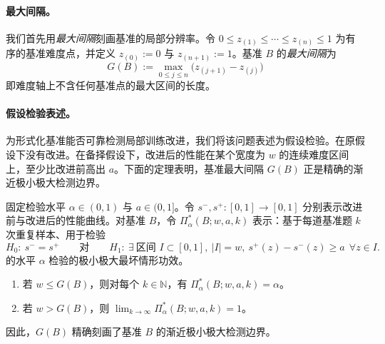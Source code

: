 

\paragraph{最大间隔。}
我们首先用\emph{最大间隔}刻画基准的局部分辨率。令 $0 \le z_{(1)} \le \cdots \le z_{(n)} \le 1$ 为有序的基准难度点，并定义 $z_{(0)}:=0$ 与 $z_{(n+1)}:=1$。基准 $B$ 的\emph{最大间隔}为
\begin{equation}
G(B):=\max_{0\le j\le n}\bigl(z_{(j+1)}-z_{(j)}\bigr)
\label{eq:max_gap}
\end{equation}
即难度轴上不含任何基准点的最大区间的长度。

\paragraph{假设检验表述。}
为形式化基准能否可靠检测局部训练改进，我们将该问题表述为假设检验。在原假设下没有改进。在备择假设下，改进后的性能在某个宽度为 $w$ 的连续难度区间上，至少比改进前高出 $a$。下面的定理表明，基准最大间隔 $G(B)$ 正是精确的渐近极小极大检测边界。

\begin{theorem}[最大间隔作为精确的渐近极小极大检测边界]
\label{thm:max-gap-detection-boundary}
固定检验水平 $\alpha\in(0,1)$ 与 $a\in(0,1]$。令 $s^-,s^+:[0,1]\to[0,1]$ 分别表示改进前与改进后的性能曲线。对基准 $B$，令 $\Pi_\alpha^*(B;w,a,k)$ 表示：基于每道基准题 $k$ 次重复样本、用于检验
\[
H_0:\ s^-=s^+
\qquad\text{对}\qquad
H_1:\ \exists\ \text{区间 } I\subset[0,1],\ |I|=w,\  s^+(z)-s^-(z)\ge a\ \ \forall z\in I.
\]
的水平 $\alpha$ 检验的极小极大最坏情形功效。
\begin{enumerate}
    \item 若 $w \le G(B)$，则对每个 $k\in\mathbb N$，有 $\Pi_\alpha^*(B;w,a,k)=\alpha$。
    \item 若 $w > G(B)$，则 $\lim_{k\to\infty}\Pi_\alpha^*(B;w,a,k)=1$。
\end{enumerate}
因此，$G(B)$ 精确刻画了基准 $B$ 的渐近极小极大检测边界。
\end{theorem}




